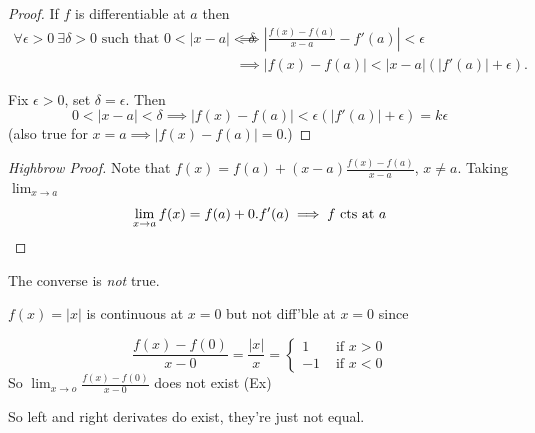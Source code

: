 \documentclass[10pt,twoside]{scrartcl}
\begin{document}
\begin{proof}[Proof] If $f$ is differentiable at $a$ then
	\begin{align*}\forall \epsilon >0~ \exists \delta  > 0 \text{ such that } 0 < |x-a| < \delta &\implies \left|\frac{f(x) - f(a)}{x-a} - f'(a)\right| < \epsilon \\ 
	&\implies |f(x) - f(a)| < |x-a|(|f'(a)| + \epsilon).	
\end{align*}

	Fix $\epsilon > 0$, set $\delta = \epsilon$. Then \[0 < |x-a| < \delta \implies  |f(x) - f(a)| < \epsilon(|f'(a)| + \epsilon) = k\epsilon\] (also true for $x = a \implies |f(x) - f(a)| = 0$.)
\end{proof}

\begin{proof}[Highbrow Proof]
Note that $f(x) = f(a) + (x-a)\frac{f(x) -f(a)}{x-a}$, $x \neq a$. Taking  $\lim_{x\to a}$  \[\lim_{x\to a}f(x) = f(a) + 0.f'(a) \implies f \text{ cts at } a\qedhere\]\end{proof}

The converse is \emph{not} true.\vspace*{10pt}

\begin{example}
$f(x) = |x|$ is continuous at $x = 0$ but not diff'ble at $x = 0$ since 

\[\frac{f(x) -f(0)}{x-0} = \frac{|x|}{x} = \begin{cases}
 1 & \text{ if } x > 0\\
 -1 & \text{ if } x < 0	
 \end{cases}
\]
So $\lim_{x\to o} \frac{f(x) -f(0)}{x-0}$ does not exist (Ex)

\begin{center}
\end{center}




So left and right derivates do exist, they're just not equal. 
\end{example}\vspace*{5pt}
\end{document}
